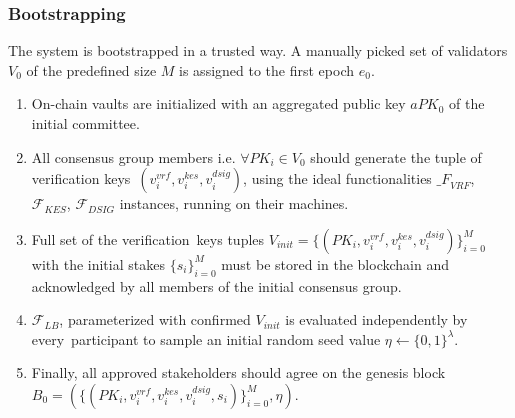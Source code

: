 \subsubsection{Bootstrapping}\label{subsubsec:bootstrapping}

The system is bootstrapped in a trusted way.
A manually picked set of validators $V_0$ of the predefined size $M$ is assigned to the first epoch $e_0$.
\begin{enumerate}
    \item On-chain vaults are initialized with an aggregated public key $aPK_0$ of the initial committee.

    \item All consensus group members i.e. $\forall PK_i \in V_0$ should generate the tuple of verification keys\
    ${(v_i^{vrf}, v_i^{kes}, v_i^{dsig})}$, using the ideal functionalities ${\mathcal_{F}}_{VRF}$,\
    ${\mathcal{F}}_{KES}$, ${\mathcal{F}}_{DSIG}$ instances, running on their machines.

    \item Full set of the verification\
    keys tuples ${V_{init} = \{(PK_i, v_i^{vrf}, v_i^{kes}, v_i^{dsig})\}_{i=0}^M}$ with the initial stakes $\{s_i\}_{i=0}^M$
    must be stored in the blockchain and acknowledged by all members of the initial consensus group.

    \item ${\mathcal{F}}_{LB}$, parameterized with confirmed $V_{init}$ is evaluated independently by every\
    participant to sample an initial random seed value $\eta \leftarrow \{0, 1\}^\lambda$.

    \item Finally, all approved stakeholders should agree on the genesis block\
    ${B_0=\left(\{(PK_i, v_i^{vrf}, v_i^{kes}, v_i^{dsig}, s_i)\}_{i=0}^M, \eta\right)}$.
\end{enumerate}

